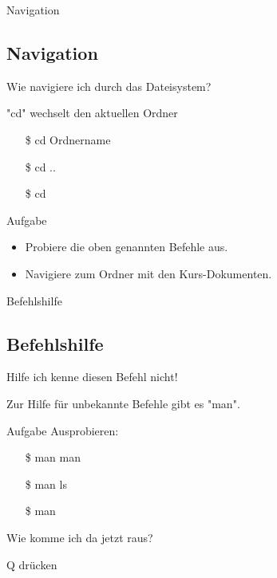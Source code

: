 \begin{frame}{Navigation}
    \subsection{Navigation}\label{subsec:navigation}

    Wie navigiere ich durch das Dateisystem?

    \textrightarrow "cd" wechselt den aktuellen Ordner

    \begin{itemize}
        \item[\$] cd Ordnername
        \item[\$] cd ..
        \item[\$] cd
    \end{itemize}

    \vspace{0.5cm}
    \begin{alertblock}{Aufgabe}
        \begin{itemize}
            \item Probiere die oben genannten Befehle aus.
            \item Navigiere zum Ordner mit den Kurs-Dokumenten.
        \end{itemize}
    \end{alertblock}

\end{frame}

\begin{frame}{Befehlshilfe}
    \subsection{Befehlshilfe}\label{subsec:befehlshilfe}

    Hilfe ich kenne diesen Befehl nicht!\pause

    \textrightarrow Zur Hilfe für unbekannte Befehle gibt es "man".

    \vspace{0.5cm}
    \begin{alertblock}{Aufgabe}
        Ausprobieren:

        \begin{itemize}
            \item[\$] man man
            \item[\$] man ls
            \item[\$] man
        \end{itemize}
    \end{alertblock}

    Wie komme ich da jetzt raus?

    \textrightarrow Q drücken

\end{frame}

